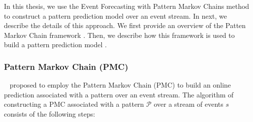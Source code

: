\par In this thesis, we use the Event Forecasting with Pattern Markov Chains method \cite{alevizos2017event} to construct a pattern prediction model over an event stream. In next, we describe the details of this approach. We first provide an overview of the Patten Markov Chain framework \cite{nuel_pattern_2008}. Then, we describe how this framework is used to build a pattern prediction model \cite{alevizos2017event}.  


\subsubsection*{Pattern Markov Chain (PMC)}

~\citet{alevizos2017event} proposed to employ the Pattern Markov Chain (PMC) \cite{nuel_pattern_2008} to build an online prediction associated with a pattern over an event stream. The algorithm of constructing a PMC associated with a pattern $\mathcal{P}$ over a stream of events $s$ consists of the following steps:

